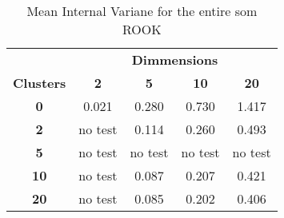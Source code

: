 \begin{table}
\caption{Mean Internal Variane for the entire som ROOK}
\label{ivtable2}
\begin{tabular}{|c||c|c|c|c|}
\hline
&\multicolumn{4}{c|}{\textbf{Dimmensions}}\\
\textbf{Clusters} & \multicolumn{1}{c}{\textbf{2}} &
\multicolumn{1}{c}{\textbf{5}} & \multicolumn{1}{c}{\textbf{10}} &
\multicolumn{1}{c|}{\textbf{20}}\\
\hline
\hline
\textbf{0} & 0.021& 0.280& 0.730& 1.417 \\
\hline
\textbf{2} & no test& 0.114& 0.260& 0.493 \\
\hline
\textbf{5} & no test& no test& no test& no test \\
\hline
\textbf{10} & no test& 0.087& 0.207& 0.421 \\
\hline
\textbf{20} & no test& 0.085& 0.202& 0.406 \\
\hline
\end{tabular} \end{table}

